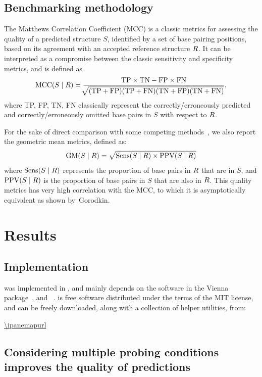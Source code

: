 \documentclass[a4,center,fleqn]{NAR}
\begin{document}
\subsection*{Benchmarking methodology}

The Matthews Correlation Coefficient (MCC) is a classic metrics for assessing the quality of a predicted structure $S$, identified by a set of base pairing positions, based on its agreement with an accepted reference structure $R$. It can be interpreted as a compromise between the classic sensitivity and specificity metrics, and is defined as 
$$\text{MCC}(S\mid R)=\frac{\text{TP} \times \text{TN} -\text{FP} \times \text{FN}}{\sqrt[]{(\text{TP}+\text{FP})(\text{TP}+\text{FN})(\text{TN}+\text{FP})(\text{TN}+\text{FN})}},$$
where TP, FP, TN, FN classically represent the correctly/erroneously predicted and correctly/erroneously omitted base pairs in $S$ with respect to $R$.

For the sake of direct comparison with some competing methods~\cite{Spasic2017}, we also report the geometric mean metrics, defined as:
$$ \text{GM}(S\mid R)=\sqrt{\text{Sens}(S\mid R)\times \text{PPV}(S\mid R)} $$
where $\text{Sens}(S\mid R)$ represents the proportion of base pairs in $R$ that are in $S$, and $\text{PPV}(S\mid R)$ is the proportion of base pairs in $S$ that are also in $R$. This quality metrics has very high correlation with the MCC, to which it is asymptotically equivalent as shown by~Gorodkin\etal\cite{Gorodkin2001}.

\section*{Results}

\subsection*{Implementation}

\OurTool{} was implemented in , and mainly depends on the  software in the Vienna package~\cite{Lorenz2011}, and ~\cite{Pedregosa2012}. \OurTool{} is free software distributed under the terms of the MIT license, and can be freely downloaded, along with a collection of helper utilities, from:

{\centering \url{\ipanemapurl}\\}

\subsection*{Considering multiple probing conditions improves the quality of predictions}\label{sec:cordero}
\end{document}
